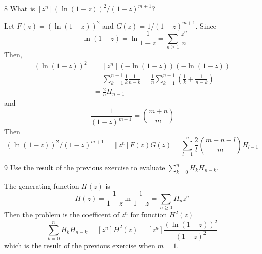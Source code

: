 \documentclass[a4paper,12pt]{article}
\makeatletter
\newtheorem*{solution}{Solution}
\theoremstyle{definition}
\renewenvironment{solution}[1][Solution] {\par\pushQED{\qed}\normalfont\topsep6\p@\@plus6\p@\relax\trivlist\item[\hskip\labelsep\bfseries#1\@addpunct{.}]\ignorespaces}{\popQED\endtrivlist\@endpefalse} \makeatother
\newenvironment{problems}{\begin{list}{}{\renewcommand{\makelabel}[1]{\textbf{##1}\hfil}}}{\end{list}}
\makeatother
\begin{document}
\begin{problems}
   \item[8] What is $[z^n](\ln(1-z))^2/(1-z)^{m+1}$?
   \begin{solution}
      Let $F(z)=(\ln(1-z))^2$ and $G(z)=1/(1-z)^{m+1}$. Since 
      \begin{equation*}
         -\ln(1-z) = \ln \frac{1}{1-z} = \sum_{n\geq 1}\frac{z^n}{n}
      \end{equation*}
      Then,
      \begin{align*}
         [z^n](\ln(1-z))^2 &= [z^n](-\ln(1-z))(-\ln(1-z)) \\&= \sum_{k=1}^{n-1}\frac{1}{k}\frac{1}{n-k}= \frac{1}{n}\sum_{k=1}^{n-1}\left(\frac{1}{k}+\frac{1}{n-k}\right)\\ &= \frac{2}{n}H_{n-1}
      \end{align*}
      and
      \begin{equation*}
         [z^n]\frac{1}{(1-z)^{m+1}} = \binom{m+n}{m}
      \end{equation*}
      Then
      \begin{equation*}
         [z^n](\ln(1-z))^2/(1-z)^{m+1} = [z^n]F(z)G(z) =\sum_{l=1}^n  \frac{2}{l}\binom{m+n-l}{m}H_{l-1}
      \end{equation*}
   \end{solution} 
   \item[9] Use the result of the previous exercise to evaluate $\sum_{k=0}^n H_k H_{n-k}$.
   \begin{solution}
      The generating function $H(z)$ is 
      \begin{equation*}
         H(z) = \frac{1}{1-z}\ln\frac{1}{1-z} = \sum_{n\geq 0} H_n z^n
      \end{equation*}
      Then the problem is the coefficent of $z^n$ for function $H^2(z)$
      \begin{equation*}
         \sum_{k=0}^n H_k H_{n-k} = [z^n] H^2(z) = [z^n] \frac{(\ln(1-z))^2}{(1-z)^2}
      \end{equation*}
      which is the result of the previous exercise when $m=1$.


\end{solution}
\end{problems}
\end{document}

